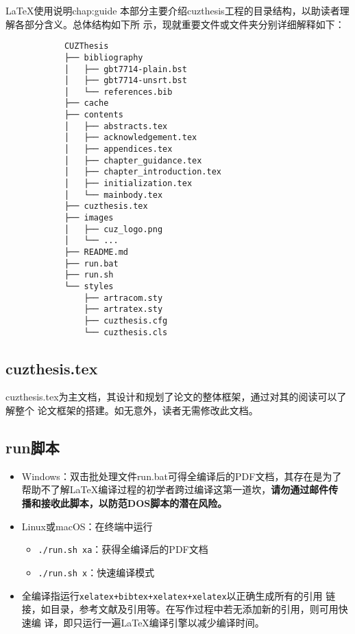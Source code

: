 \begin{cuzchapter}{\LaTeX{}使用说明}{chap:guide}
本部分主要介绍cuzthesis工程的目录结构，以助读者理解各部分含义。总体结构如下所
示，现就重要文件或文件夹分别详细解释如下：

\begingroup
    \small\linespread{1}
    \begin{center}
        \begin{verbatim}
            CUZThesis
            ├── bibliography
            │   ├── gbt7714-plain.bst
            │   ├── gbt7714-unsrt.bst
            │   └── references.bib
            ├── cache
            ├── contents
            │   ├── abstracts.tex
            │   ├── acknowledgement.tex
            │   ├── appendices.tex
            │   ├── chapter_guidance.tex
            │   ├── chapter_introduction.tex
            │   ├── initialization.tex
            │   └── mainbody.tex
            ├── cuzthesis.tex
            ├── images
            │   ├── cuz_logo.png
            │   └── ...
            ├── README.md
            ├── run.bat
            ├── run.sh
            └── styles
                ├── artracom.sty
                ├── artratex.sty
                ├── cuzthesis.cfg
                └── cuzthesis.cls
        \end{verbatim}
    \end{center}
\endgroup

\subsection{cuzthesis.tex}\label{sub:cuzthesis}

cuzthesis.tex为主文档，其设计和规划了论文的整体框架，通过对其的阅读可以了解整个
论文框架的搭建。如无意外，读者无需修改此文档。

\subsection{run脚本}\label{sub:scripts}

\begin{itemize}
    \item Windows：双击批处理文件run.bat可得全编译后的PDF文档，其存在是为了
    帮助不了解\LaTeX{}编译过程的初学者跨过编译这第一道坎，\textbf{请勿通过邮件传
    播和接收此脚本，以防范DOS脚本的潜在风险。}
    \item Linux或macOS：在终端中运行
        \begin{itemize}
            \item \verb|./run.sh xa|：获得全编译后的PDF文档
            \item \verb|./run.sh x|：快速编译模式
        \end{itemize}
    \item 全编译指运行\verb|xelatex+bibtex+xelatex+xelatex|以正确生成所有的引用
    链接，如目录，参考文献及引用等。在写作过程中若无添加新的引用，则可用快速编
    译，即只运行一遍\LaTeX{}编译引擎以减少编译时间。
\end{itemize}


\end{cuzchapter}
